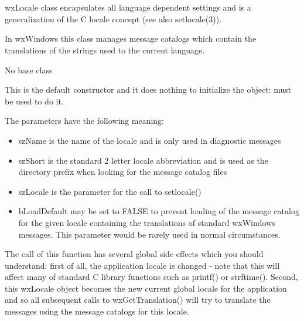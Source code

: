 %
%


\section{}\label{wxlocale}

wxLocale class encapsulates all language dependent settings and is a
generalization of the C locale concept (see also setlocale(3)).

In wxWindows this class manages message catalogs which contain the translations
of the strings used to the current language.


No base class


\label{wxlocaledefctor}


This is the default constructor and it does nothing to initialize the object: 
 must be used to do it.

\label{wxlocalewxlocale}


The parameters have the following meaning:
\begin{itemize}\itemsep=0pt
\item szName is the name of the locale and is only used in diagnostic messages
\item szShort is the standard 2 letter locale abbreviation and is used as the
directory prefix when looking for the message catalog files
\item szLocale is the parameter for the call to setlocale()
\item bLoadDefault may be set to FALSE to prevent loading of the message catalog
for the given locale containing the translations of standard wxWindows messages.
This parameter would be rarely used in normal circumstances.
\end{itemize}

The call of this function has several global side effects which you should
understand: first of all, the application locale is changed - note that this
will affect many of standard C library functions such as printf() or strftime().
Second, this wxLocale object becomes the new current global locale for the
application and so all subsequent calls to wxGetTranslation() will try to
translate the messages using the message catalogs for this locale.

